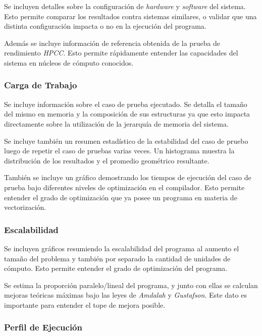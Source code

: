\documentclass[a4paper]{report}
\begin{document}
Se incluyen detalles sobre la configuración de {\it hardware} y {\it software} del sistema.
Esto permite comparar los resultados contra sistemas similares, o validar que una distinta configuración impacta o no en la ejecución del programa.

\bigskip

Además se incluye información de referencia obtenida de la prueba de rendimiento {\it HPCC}. Esto permite rápidamente entender las capacidades del sistema en núcleos de cómputo conocidos.

\subsubsection{Carga de Trabajo}

Se incluye información sobre el caso de prueba ejecutado. Se detalla el tamaño del mismo en memoria y la composición de sus estructuras ya que esto impacta directamente sobre la utilización de la jerarquía de memoria del sistema.

\bigskip

Se incluye también un resumen estadístico de la estabilidad del caso de pruebo luego de repetir el caso de pruebas varias veces.
Un histograma muestra la distribución de los resultados y el promedio geométrico resultante.

\bigskip

También se incluye un gráfico demostrando los tiempos de ejecución del caso de prueba bajo diferentes niveles de optimización en el compilador.
Esto permite entender el grado de optimización que ya posee un programa en materia de vectorización.

\subsubsection{Escalabilidad}

Se incluyen gráficos resumiendo la escalabilidad del programa al aumento el tamaño del problema y también por separado la cantidad de unidades de cómputo. Esto permite entender el grado de optimización del programa.

\bigskip

Se estima la proporción paralelo/lineal del programa, y junto con ellas se calculan mejoras teóricas máximas bajo las leyes de {\it Amdalah} y {\it Gustafson}.
Este dato es importante para entender el tope de mejora posible.

\subsubsection{Perfil de Ejecución}
\end{document}
